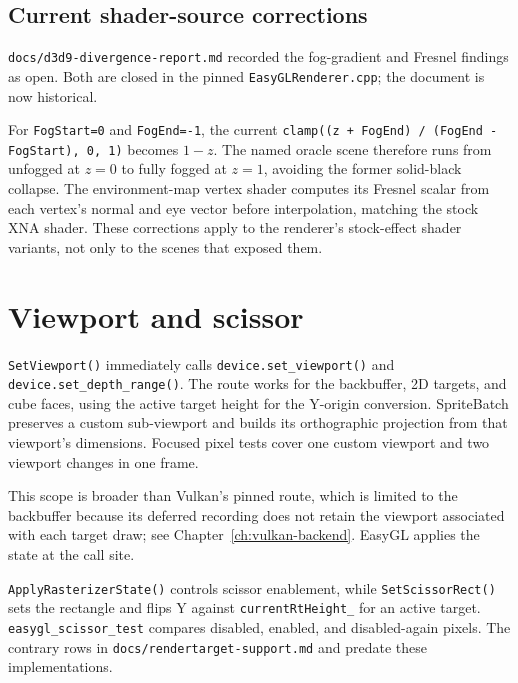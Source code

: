 \subsection{Current shader-source corrections}

\begin{historynote}
\texttt{docs/d3d9-divergence-report.md} recorded the fog-gradient and Fresnel findings as open.
Both are closed in the pinned \texttt{EasyGLRenderer.cpp}; the document is now historical.
\end{historynote}

For \texttt{FogStart=0} and \texttt{FogEnd=-1}, the current
\texttt{clamp((z + FogEnd) / (FogEnd - FogStart), 0, 1)} becomes $1-z$. The named oracle scene
therefore runs from unfogged at $z=0$ to fully fogged at $z=1$, avoiding the former solid-black
collapse. The environment-map vertex shader computes its Fresnel scalar from each vertex's normal
and eye vector before interpolation, matching the stock XNA shader. These corrections apply to
the renderer's stock-effect shader variants, not only to the scenes that exposed them.

\section{Viewport and scissor}

\begin{contractnote}
\texttt{SetViewport()} immediately calls \texttt{device.set\_viewport()} and
\texttt{device.set\_depth\_range()}. The route works for the backbuffer, 2D targets, and cube
faces, using the active target height for the Y-origin conversion. SpriteBatch preserves a custom
sub-viewport and builds its orthographic projection from that viewport's dimensions. Focused
pixel tests cover one custom viewport and two viewport changes in one frame.
\end{contractnote}

This scope is broader than Vulkan's pinned route, which is limited to the backbuffer because its
deferred recording does not retain the viewport associated with each target draw; see
Chapter~\ref{ch:vulkan-backend}. EasyGL applies the state at the call site.

\texttt{ApplyRasterizerState()} controls scissor enablement, while
\texttt{SetScissorRect()} sets the rectangle and flips Y against \texttt{currentRtHeight\_} for
an active target. \texttt{easygl\_scissor\_test} compares disabled, enabled, and disabled-again
pixels. The contrary rows in \texttt{docs/rendertarget-support.md} and
 predate these implementations.

